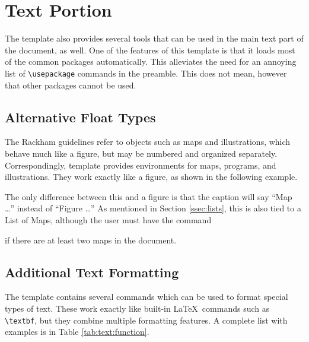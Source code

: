 \documentclass[thesis]{./tex/thesis-umich}
\begin{document}
\section{Text Portion}
The template also provides several tools that can be used in the main
text part of the document, as well.  One of the features of this
template is that it loads most of the common packages automatically.
This alleviates the need for an annoying list of \verb|\usepackage|
commands in the preamble.  This does not mean, however that other
packages cannot be used.


\subsection{Alternative Float Types}  \label{ssec:float}
The Rackham guidelines refer to objects such as maps and illustrations,
which behave much like a figure, but may be numbered and organized
separately. Correspondingly, template provides environments for maps,
programs, and illustrations.  They work exactly like a figure, as shown
in the following example.
\begin{code}
\begin{map}
 \centering
 \caption{...}
\end{map}
\end{code}
The only difference between this and a figure is that the caption will
say ``Map \ldots'' instead of ``Figure \ldots''  As mentioned in Section
\ref{ssec:lists}, this is also tied to a List of Maps, although the user
must have the command
\begin{code}
\showlistofmaps
\end{code}
if there are at least two maps in the document.

\subsection{Additional Text Formatting}
The template contains several commands which can be used to format
special types of text.  These work exactly like built-in
\LaTeX~commands such as \verb|\textbf|, but they combine multiple
formatting features.  A complete list with examples is in Table
\ref{tab:text:function}.
\end{document}
